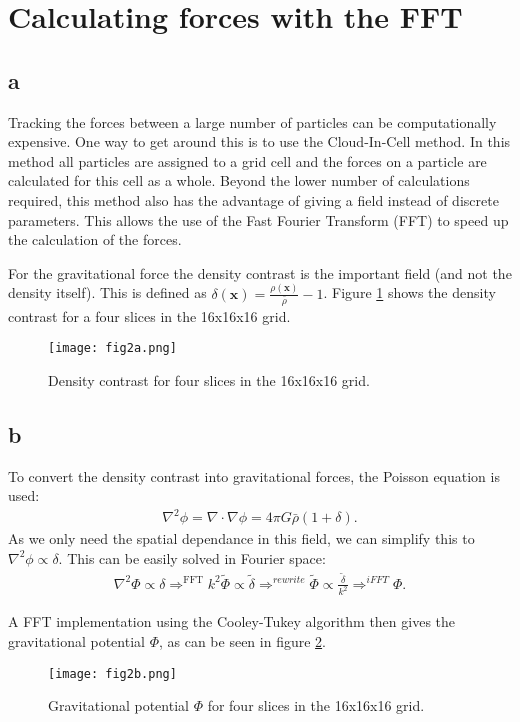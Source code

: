 \section{Calculating forces with the FFT}


\subsection*{a}
Tracking the forces between a large number of particles can be computationally expensive.
One way to get around this is to use the Cloud-In-Cell method.
In this method all particles are assigned to a grid cell and the forces on a particle are calculated for this cell as a whole.
Beyond the lower number of calculations required, this method also has the advantage of giving a field instead of discrete parameters.
This allows the use of the Fast Fourier Transform (FFT) to speed up the calculation of the forces.

For the gravitational force the density contrast is the important field (and not the density itself).
This is defined as $\delta(\mathbf{x}) = \frac{\rho(\mathbf{x})}{\bar{\rho}} - 1$.
Figure \ref{fig:density_contrast} shows the density contrast for a four slices in the 16x16x16 grid.
\begin{figure}
    \centering
    \texttt{[image: fig2a.png]}
    \caption{Density contrast for four slices in the 16x16x16 grid.}
    \label{fig:density_contrast}
\end{figure}



\subsection*{b}
To convert the density contrast into gravitational forces, the Poisson equation is used:
\begin{align}
    \nabla^2 \phi = \nabla \cdot \nabla \phi = 4 \pi G \bar{\rho} (1 + \delta).
\end{align}
As we only need the spatial dependance in this field, we can simplify this to $\nabla^2 \phi \propto \delta$.
This can be easily solved in Fourier space:
\begin{align}
    \nabla^2 \Phi \propto \delta \Rightarrow^{\text{FFT}} k^2 \tilde{\Phi} \propto \tilde{\delta} \Rightarrow^{rewrite} \tilde{\Phi} \propto \frac{\tilde{\delta}}{k^2}
    \Rightarrow^{iFFT} \Phi.    
\end{align}

A FFT implementation using the Cooley-Tukey algorithm then gives the gravitational potential $\Phi$, as can be seen in figure \ref{fig:gravitational_potential}.
\begin{figure}
    \centering
    \texttt{[image: fig2b.png]}
    \caption{Gravitational potential $\Phi$ for four slices in the 16x16x16 grid.}
    \label{fig:gravitational_potential}
\end{figure}




